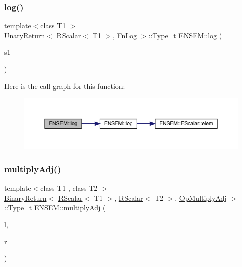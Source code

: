 \subsubsection{\texorpdfstring{log()}{log()}}
{\footnotesize\ttfamily template$<$class T1 $>$ \\
\mbox{\hyperlink{structENSEM_1_1UnaryReturn}{Unary\+Return}}$<$ \mbox{\hyperlink{classENSEM_1_1RScalar}{R\+Scalar}}$<$ T1 $>$, \mbox{\hyperlink{structENSEM_1_1FnLog}{Fn\+Log}} $>$\+::Type\+\_\+t E\+N\+S\+E\+M\+::log (\begin{DoxyParamCaption}\item[{const \mbox{\hyperlink{classENSEM_1_1RScalar}{R\+Scalar}}$<$ T1 $>$ \&}]{s1 }\end{DoxyParamCaption})\hspace{0.3cm}{\ttfamily [inline]}}

Here is the call graph for this function\+:\nopagebreak
\begin{figure}[H]
\begin{center}
\leavevmode
\includegraphics[width=350pt]{d9/ded/group__rscalar_gacf4bc45f226554e38012a20a649605ed_cgraph}
\end{center}
\end{figure}
\mbox{\label{group__rscalar_ga5b26c70325ac5d320cfd53d629b3d0c4}} 
\subsubsection{\texorpdfstring{multiplyAdj()}{multiplyAdj()}}
{\footnotesize\ttfamily template$<$class T1 , class T2 $>$ \\
\mbox{\hyperlink{structENSEM_1_1BinaryReturn}{Binary\+Return}}$<$ \mbox{\hyperlink{classENSEM_1_1RScalar}{R\+Scalar}}$<$ T1 $>$, \mbox{\hyperlink{classENSEM_1_1RScalar}{R\+Scalar}}$<$ T2 $>$, \mbox{\hyperlink{structENSEM_1_1OpMultiplyAdj}{Op\+Multiply\+Adj}} $>$\+::Type\+\_\+t E\+N\+S\+E\+M\+::multiply\+Adj (\begin{DoxyParamCaption}\item[{const \mbox{\hyperlink{classENSEM_1_1RScalar}{R\+Scalar}}$<$ T1 $>$ \&}]{l,  }\item[{const \mbox{\hyperlink{classENSEM_1_1RScalar}{R\+Scalar}}$<$ T2 $>$ \&}]{r }\end{DoxyParamCaption})\hspace{0.3cm}{\ttfamily [inline]}}

